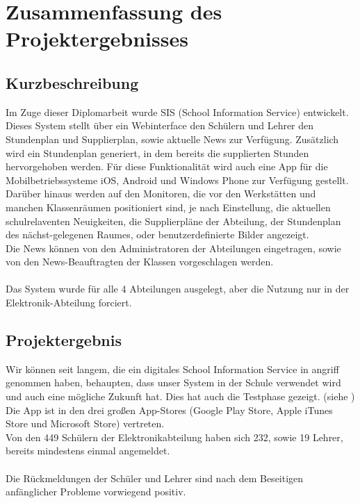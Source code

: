 \chapter[Zusammenfassung]{Zusammenfassung des Projektergebnisses}

\section{Kurzbeschreibung}
Im Zuge dieser Diplomarbeit wurde SIS (School Information Service) entwickelt. \\
Dieses System stellt über ein Webinterface den Schülern und Lehrer den Stundenplan und Supplierplan, sowie aktuelle News zur Verfügung. Zusätzlich wird ein Stundenplan generiert, in dem bereits die supplierten Stunden hervorgehoben werden.
Für diese Funktionalität wird auch eine App für die Mobilbetriebssysteme iOS, Android und Windows Phone zur Verfügung gestellt.\\
Darüber hinaus werden auf den Monitoren, die vor den Werkstätten und manchen Klassenräumen positioniert sind, je nach Einstellung, die aktuellen schulrelaventen Neuigkeiten, die Supplierpläne der Abteilung, der Stundenplan des nächst-gelegenen Raumes, oder benutzerdefinierte Bilder angezeigt.\\
Die News können von den Administratoren der Abteilungen eingetragen, sowie von den News-Beauftragten der Klassen vorgeschlagen werden.\\
\\
Das System wurde für alle 4 Abteilungen ausgelegt, aber die Nutzung nur in der Elektronik-Abteilung forciert.

\section{Projektergebnis}
Wir können seit langem, die ein digitales School Information Service in angriff genommen haben, behaupten, dass unser System in der Schule verwendet wird und auch eine mögliche Zukunft hat. Dies hat auch die Testphase gezeigt. (siehe )\\
Die App ist in den drei großen App-Stores (Google Play Store, Apple iTunes Store und Microsoft Store) vertreten.\\
Von den 449 Schülern der Elektronikabteilung haben sich 232, sowie 19 Lehrer, bereits mindestens einmal angemeldet. \\
\\
Die Rückmeldungen der Schüler und Lehrer sind nach dem Beseitigen anfänglicher Probleme vorwiegend positiv.

